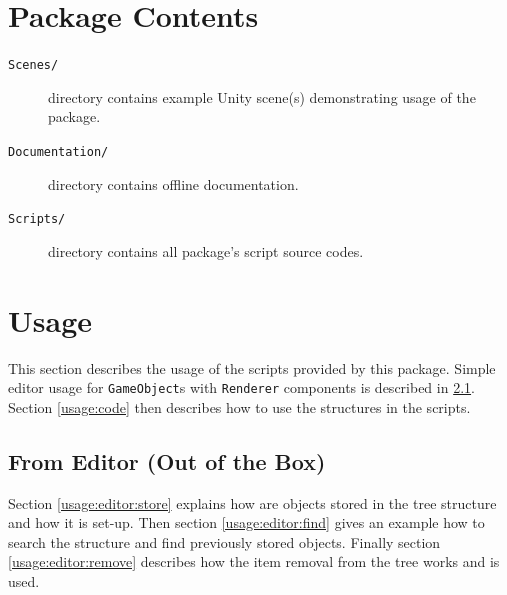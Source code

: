 \documentclass{article}
\begin{document}
\section{Package Contents}
\begin{description}
    \item[\texttt{Scenes/}]
    directory contains example Unity scene(s) demonstrating usage of the package.
    
    \item[\texttt{Documentation/}]
    directory contains offline documentation.
    
    \item[\texttt{Scripts/}]
    directory contains all package's script source codes.
\end{description}

\section{Usage} \label{usage}
This section describes the usage of the scripts provided by this package.
Simple editor usage for \texttt{GameObject}s with \texttt{Renderer} components is described in \ref{usage:editor}.
Section \ref{usage:code} then describes how to use the structures in the scripts.

\subsection{From Editor (Out of the Box)} \label{usage:editor}
Section \ref{usage:editor:store} explains how are objects stored in the tree structure and how it is set-up.
Then section \ref{usage:editor:find} gives an example how to search the structure and find previously stored objects.
Finally section \ref{usage:editor:remove} describes how the item removal from the tree works and is used.
\end{document}
